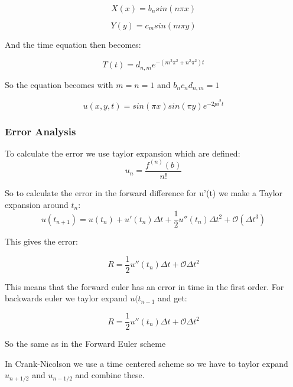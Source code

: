 \documentclass[a4paper,10pt]{article}
\begin{document}
\begin{equation}
 X(x) = b_nsin(n\pi x)
\end{equation}

\begin{equation}
 Y(y) = c_msin(m\pi y)
\end{equation}

And the time equation then becomes:

\begin{equation}
 T(t) = d_{n,m}e^{-(m^2\pi^2 + n^2\pi^2)t}
\end{equation}

So the equation becomes with $m=n=1$ and $b_nc_nd_{n,m} = 1$

\begin{equation}
 u(x,y,t) = sin(\pi x)sin(\pi y) e^{-2pi^2t}
\end{equation}

\subsubsection{Error Analysis}
To calculate the error we use taylor expansion which are defined:
\begin{equation}
 u_n = \frac{f^{(n)}(b)}{n!}
\end{equation}

So to calculate the error in the forward difference for u'(t) we make a Taylor expansion around $t_n$:
\begin{equation}
 u(t_{n+1}) = u(t_n) + u'(t_n)\Delta t + \frac{1}{2}u''(t_n)\Delta t^2 + \mathcal{O}(\Delta t^3)
\end{equation}

This gives the error:

\begin{equation}
 R = \frac{1}{2}u''(t_n)\Delta t + \mathcal{O}\Delta t^2
\end{equation}

This means that the forward euler has an error in time in the first order. 
For backwards euler we taylor expand $u(t_{n-1}$ and get:

\begin{equation}
  R = \frac{1}{2}u''(t_n)\Delta t + \mathcal{O}\Delta t^2
\end{equation}

So the same as in the Forward Euler scheme

In Crank-Nicolson we use a time centered scheme so we have to taylor expand $u_{n+ 1/2}$ and $u_{n-1/2}$ and combine these. 
\end{document}

